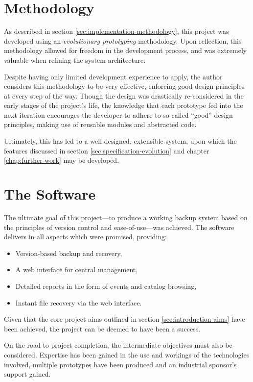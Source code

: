 \section{Methodology}

As described in section \ref{sec:implementation-methodology}, this project was
developed using an \emph{evolutionary prototyping} methodology. Upon
reflection, this methodology allowed for freedom in the development process,
and was extremely valuable when refining the system architecture.

Despite having only limited development experience to apply, the author
considers this methodology to be very effective, enforcing good design
principles at every step of the way. Though the design was drastically
re-considered in the early stages of the project's life, the knowledge that
each prototype fed into the next iteration encourages the developer to adhere
to so-called ``good'' design principles, making use of reusable modules and
abstracted code.

Ultimately, this has led to a well-designed, extensible system, upon which the
features discussed in section \ref{sec:specification-evolution} and chapter
\ref{chap:further-work} may be developed.

\section{The Software}

The ultimate goal of this project---to produce a working backup system based on
the principles of version control and ease-of-use---was achieved. The software
delivers in all aspects which were promised, providing:

\begin{itemize}
    \item Version-based backup and recovery,
    \item A web interface for central management,
    \item Detailed reports in the form of events and catalog browsing,
    \item Instant file recovery via the web interface.
\end{itemize}

Given that the core project aims outlined in section
\ref{sec:introduction-aims} have been achieved, the project can be deemed to
have been a success.

On the road to project completion, the intermediate objectives must also be
considered. Expertise has been gained in the use and workings of the
technologies involved, multiple prototypes have been produced and an industrial
sponsor's support gained.

